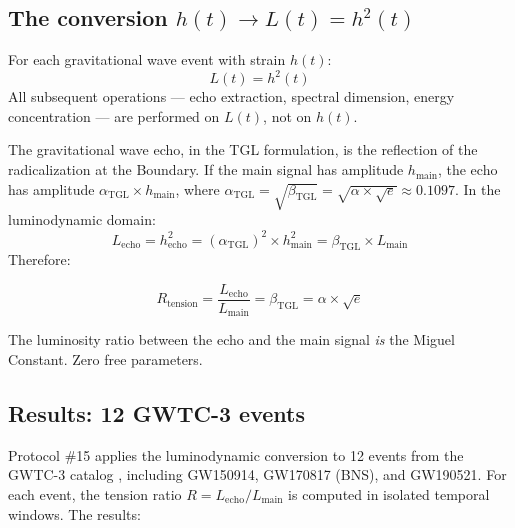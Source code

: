 \documentclass[12pt,a4paper,twoside]{article}
\newcommand{\betatgl}{\beta_{\!\scriptscriptstyle\mathrm{TGL}}}
\begin{document}
\subsection{The conversion $h(t) \to L(t) = h^2(t)$}

For each gravitational wave event with strain $h(t)$:
%
\begin{equation}
L(t) = h^2(t)
\end{equation}
%
All subsequent operations --- echo extraction, spectral dimension, energy concentration --- are performed on $L(t)$, not on $h(t)$.

The gravitational wave echo, in the TGL formulation, is the reflection of the radicalization at the Boundary. If the main signal has amplitude $h_{\text{main}}$, the echo has amplitude $\alpha_{\text{TGL}} \times h_{\text{main}}$, where $\alpha_{\text{TGL}} = \sqrt{\betatgl} = \sqrt{\alpha \times \sqrt{e}} \approx 0.1097$. In the luminodynamic domain:
%
\begin{equation}
L_{\text{echo}} = h_{\text{echo}}^2 = (\alpha_{\text{TGL}})^2 \times h_{\text{main}}^2 = \betatgl \times L_{\text{main}}
\end{equation}
%
Therefore:
%
\begin{equationbox}[title={Tension ratio}]
\begin{equation}
R_{\text{tension}} = \frac{L_{\text{echo}}}{L_{\text{main}}} = \betatgl = \alpha \times \sqrt{e}
\label{eq:R_tensao}
\end{equation}
\end{equationbox}
%
The luminosity ratio between the echo and the main signal \textit{is} the Miguel Constant. Zero free parameters.


\subsection{Results: 12 GWTC-3 events}

Protocol \#15 applies the luminodynamic conversion to 12 events from the GWTC-3 catalog \cite{GWTC3}, including GW150914, GW170817 (BNS), and GW190521. For each event, the tension ratio $R = L_{\text{echo}}/L_{\text{main}}$ is computed in isolated temporal windows. The results:
\end{document}
